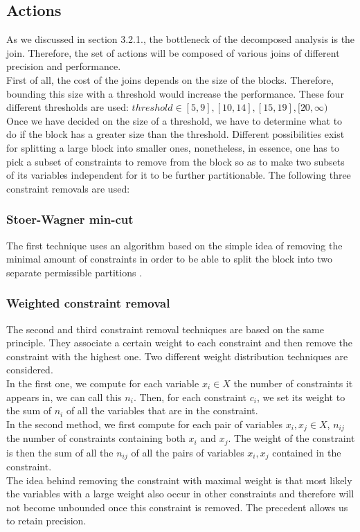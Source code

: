 \subsection{Actions}
As we discussed in section 3.2.1., the bottleneck of the decomposed analysis is the join. Therefore, the set of actions will be composed of various joins of different precision and performance.\\
First of all, the cost of the joins depends on the size of the blocks. Therefore, bounding this size with a threshold would increase the performance. These four different thresholds are used: $threshold \in [5,9],[10,14],[15,19],[20,\infty)$\\
Once we have decided on the size of a threshold, we have to determine what to do if the block has a greater size than the threshold. Different possibilities exist for splitting a large block into smaller ones, nonetheless, in essence, one has to pick a subset of constraints to remove from the block so as to make two subsets of its variables independent for it to be further partitionable. The following three constraint removals are used:
\subsubsection{Stoer-Wagner min-cut}
The first technique uses an algorithm based on the simple idea of removing the minimal amount of constraints in order to be able to split the block into two separate permissible partitions \cite{stoer1997simple}.
\subsubsection{Weighted constraint removal}
The second and third constraint removal techniques are based on the same principle. They associate a certain weight to each constraint and then remove the constraint with the highest one. Two different weight distribution techniques are considered. \\
In the first one, we compute for each variable $x_i \in X$ the number of constraints it appears in, we can call this $n_i$. Then, for each constraint $c_i$, we set its weight to the sum of $n_i$ of all the variables that are in the constraint.\\
In the second method, we first compute for each pair of variables $x_i,x_j\in X$, $n_{ij}$ the number of constraints containing both $x_i$ and $x_j$. The weight of the constraint is then the sum of all the $n_{ij}$ of all the pairs of variables $x_i,x_j$ contained in the constraint.\\
The idea behind removing the constraint with maximal weight is that most likely the variables with a large weight also occur in other constraints and therefore will not become unbounded once this constraint is removed. The precedent allows us to retain precision.
